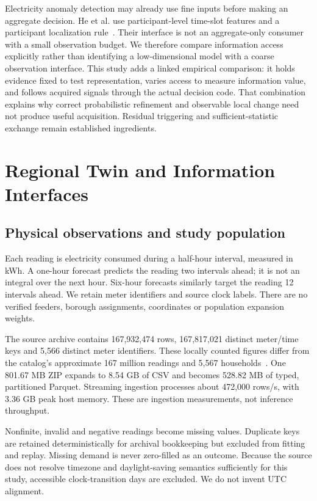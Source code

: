 \documentclass[conference]{IEEEtran}
\begin{document}
Electricity anomaly detection may already use fine inputs before making an aggregate decision. He et al. use participant-level time-slot features and a participant localization rule~\cite{he}. Their interface is not an aggregate-only consumer with a small observation budget. We therefore compare information access explicitly rather than identifying a low-dimensional model with a coarse observation interface. This study adds a linked empirical comparison: it holds evidence fixed to test representation, varies access to measure information value, and follows acquired signals through the actual decision code. That combination explains why correct probabilistic refinement and observable local change need not produce useful acquisition. Residual triggering and sufficient-statistic exchange remain established ingredients.

\section{Regional Twin and Information Interfaces}
\subsection{Physical observations and study population}
Each reading is electricity consumed during a half-hour interval, measured in kWh. A one-hour forecast predicts the reading two intervals ahead; it is not an integral over the next hour. Six-hour forecasts similarly target the reading 12 intervals ahead. We retain meter identifiers and source clock labels. There are no verified feeders, borough assignments, coordinates or population expansion weights.

The source archive contains 167,932,474 rows, 167,817,021 distinct meter/time keys and 5,566 distinct meter identifiers. These locally counted figures differ from the catalog's approximate 167 million readings and 5,567 households~\cite{london}. One 801.67 MB ZIP expands to 8.54 GB of CSV and becomes 528.82 MB of typed, partitioned Parquet. Streaming ingestion processes about 472,000 rows/s, with 3.36 GB peak host memory. These are ingestion measurements, not inference throughput.

Nonfinite, invalid and negative readings become missing values. Duplicate keys are retained deterministically for archival bookkeeping but excluded from fitting and replay. Missing demand is never zero-filled as an outcome. Because the source does not resolve timezone and daylight-saving semantics sufficiently for this study, accessible clock-transition days are excluded. We do not invent UTC alignment.
\end{document}
